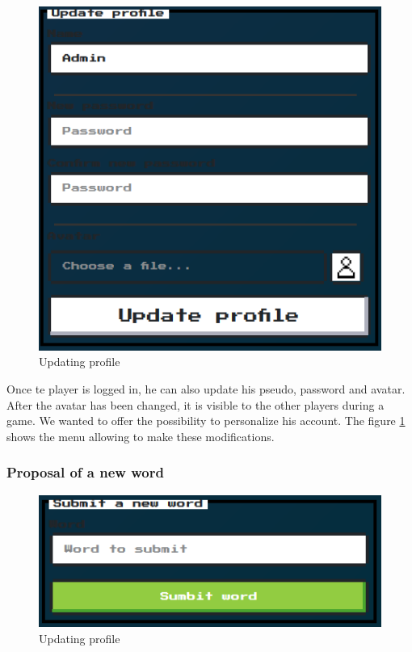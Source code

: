 \documentclass{tnreport}
\begin{document}
\begin{figure}
	\centering
	\vspace*{-2cm}
	\includegraphics[scale=0.5]{figures/update_profile}
	\caption{Updating profile}
	\label{fig:update_profile}
	\vspace*{-2cm}
\end{figure}

Once te player is logged in, he can also update his pseudo, password and avatar. After the avatar has been changed, it is visible to the other players during a game. We wanted to offer the possibility to personalize his account. The figure \ref{fig:update_profile} shows the menu allowing to make these modifications. 

\bigskip
\bigskip

\subsubsection{Proposal of a new word}

\begin{figure}
	\centering
	\includegraphics[scale=0.5]{figures/send_word}
	\caption{Updating profile}
	\label{fig:send_word}
\end{figure}
\end{document}
